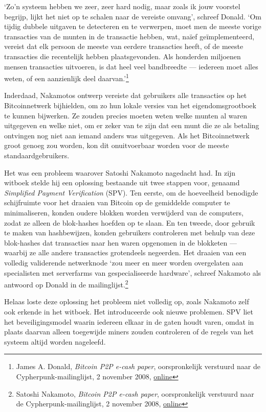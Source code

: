 \documentclass[
  a5paper,
  smalldemyvopaper,11pt,twoside,onecolumn,openright,extrafontsizes,
hidelinks]{memoir}
\begin{document}
`Zo'n systeem hebben we zeer, zeer hard nodig, maar zoals ik jouw
voorstel begrijp, lijkt het niet op te schalen naar de vereiste omvang',
schreef Donald. `Om tijdig dubbele uitgaven te detecteren en te
verwerpen, moet men de meeste vorige transacties van de munten in de
transactie hebben, wat, naïef geïmplementeerd, vereist dat elk persoon
de meeste van eerdere transacties heeft, of de meeste transacties die
recentelijk hebben plaatsgevonden. Als honderden miljoenen mensen
transacties uitvoeren, is dat heel veel bandbreedte --- iedereen moet
alles weten, of een aanzienlijk deel daarvan.'\footnote{James A. Donald,
  \emph{Bitcoin P2P e-cash paper}, oorspronkelijk verstuurd naar de
  Cypherpunk-mailinglijst, 2 november 2008,
  \href{https://www.metzdowd.com/pipermail/cryptography/2008-November/014814.html}{online}}

Inderdaad, Nakamotos ontwerp vereiste dat gebruikers alle transacties op
het Bitcoinnetwerk bijhielden, om zo hun lokale versies van het
eigendomsgrootboek te kunnen bijwerken. Ze zouden precies moeten weten
welke munten al waren uitgegeven en welke niet, om er zeker van te zijn
dat een munt die ze als betaling ontvingen nog niet aan iemand anders
was uitgegeven. Als het Bitcoinnetwerk groot genoeg zou worden, kon dit
onuitvoerbaar worden voor de meeste standaardgebruikers.

Het was een probleem waarover Satoshi Nakamoto nagedacht had. In zijn
witboek stelde hij een oplossing bestaande uit twee stappen voor,
genaamd \emph{Simplified Payment Verification} (SPV). Ten eerste, om de
hoeveelheid benodigde schijfruimte voor het draaien van Bitcoin op de
gemiddelde computer te minimaliseren, konden oudere blokken worden
verwijderd van de computers, zodat ze alleen de blok-hashes hoefden op
te slaan. En ten tweede, door gebruik te maken van hashbewijzen, konden
gebruikers controleren met behulp van deze blok-hashes dat transacties
naar hen waren opgenomen in de blokketen --- waarbij ze alle andere
transacties grotendeels negeerden. Het draaien van een volledig
validerende netwerknode `zou meer en meer worden overgelaten aan
specialisten met serverfarms van gespecialiseerde hardware', schreef
Nakamoto als antwoord op Donald in de mailinglijst.\footnote{Satoshi
  Nakamoto, \emph{Bitcoin P2P e-cash paper}, oorspronkelijk verstuurd
  naar de Cypherpunk-mailinglijst, 2 november 2008,
  \href{https://www.metzdowd.com/pipermail/cryptography/2008-November/014815.html}{online}}

Helaas loste deze oplossing het probleem niet volledig op, zoals
Nakamoto zelf ook erkende in het witboek. Het introduceerde ook nieuwe
problemen. SPV liet het beveiligingsmodel waarin iedereen elkaar in de
gaten houdt varen, omdat in plaats daarvan alleen toegewijde miners
zouden controleren of de regels van het systeem altijd worden nageleefd.
\end{document}
